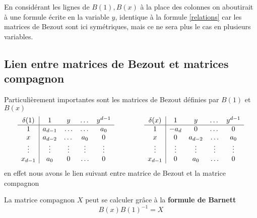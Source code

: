 \documentclass{standalone}
\begin{document}
  \begin{rem}
  En considérant les lignes de $B(1), B(x)$ à la place des colonnes on aboutirait à une formule écrite en la variable $y$, identique à la formule \ref{relations} car les matrices de Bezout sont ici symétriques, mais ce ne sera plus le cas en plusieurs variables.
  \end{rem}


  \subsection{Lien entre matrices de Bezout et matrices compagnon}
  \label{Bar}
  Particulièrement importantes sont les matrices de Bezout définies par $B(1)$ et $B(x)$
  \begin{equation}
  	\begin{array}{c|cccc}
  		\delta(1) & 1 & y & \dots & y^{d-1} \\
  		\hline
  		1 & a_{d-1} & \ldots & \dots & a_0 \\
  		x & a_{d-2} & \dots & a_0 & 0 \\
  		\vdots & \vdots & \vdots & \vdots & \vdots \\
  		x_{d-1} & a_0 & 0 & \ldots & 0 \\
  	\end{array}
  	\hspace{1.5cm}
  	\begin{array}{c|cccc}
  		\delta(x) & 1 & y & \dots & y^{d-1} \\
  		\hline
  		1 & -a_{d} & 0 & \dots & 0 \\
  		x & 0 & a_{d-2} & \ldots & a_0 \\
  		\vdots & \vdots & \vdots & \vdots & \vdots \\
  		x_{d-1} & 0 & a_0 & \ldots & 0 \\
  	\end{array}
  \end{equation}
  en effet nous avons le lien suivant entre matrice de Bezout et la matrice compagnon
  \begin{prop}
  \label{Barnett}
  La matrice compagnon $X$ peut se calculer grâce à la {\bf formule de Barnett}
  \cite{Barnett}
  \begin{equation}
  	B(x)B(1)^{-1} = X
  \end{equation}
  \end{prop}
\end{document}
